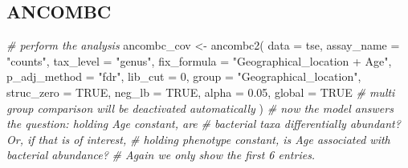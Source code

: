 \documentclass[
]{book}
\newenvironment{Shaded}{\begin{snugshade}}{\end{snugshade}}
\newcommand{\AttributeTok}[1]{\textcolor[rgb]{0.77,0.63,0.00}{#1}}
\newcommand{\CommentTok}[1]{\textcolor[rgb]{0.56,0.35,0.01}{\textit{#1}}}
\newcommand{\ConstantTok}[1]{\textcolor[rgb]{0.00,0.00,0.00}{#1}}
\newcommand{\DecValTok}[1]{\textcolor[rgb]{0.00,0.00,0.81}{#1}}
\newcommand{\FloatTok}[1]{\textcolor[rgb]{0.00,0.00,0.81}{#1}}
\newcommand{\FunctionTok}[1]{\textcolor[rgb]{0.00,0.00,0.00}{#1}}
\newcommand{\NormalTok}[1]{#1}
\newcommand{\OtherTok}[1]{\textcolor[rgb]{0.56,0.35,0.01}{#1}}
\newcommand{\SpecialCharTok}[1]{\textcolor[rgb]{0.00,0.00,0.00}{#1}}
\newcommand{\StringTok}[1]{\textcolor[rgb]{0.31,0.60,0.02}{#1}}
\begin{document}
\hypertarget{ancombc}{%
\subsection{ANCOMBC}\label{ancombc}}

\begin{Shaded}
\begin{Highlighting}[]
\CommentTok{\# perform the analysis }
\NormalTok{ancombc\_cov }\OtherTok{\textless{}{-}} \FunctionTok{ancombc2}\NormalTok{(}
  \AttributeTok{data =}\NormalTok{ tse,}
  \AttributeTok{assay\_name =} \StringTok{"counts"}\NormalTok{,}
  \AttributeTok{tax\_level =} \StringTok{"genus"}\NormalTok{,}
  \AttributeTok{fix\_formula =} \StringTok{"Geographical\_location + Age"}\NormalTok{, }
  \AttributeTok{p\_adj\_method =} \StringTok{"fdr"}\NormalTok{, }
  \AttributeTok{lib\_cut =} \DecValTok{0}\NormalTok{, }
  \AttributeTok{group =} \StringTok{"Geographical\_location"}\NormalTok{, }
  \AttributeTok{struc\_zero =} \ConstantTok{TRUE}\NormalTok{, }
  \AttributeTok{neg\_lb =} \ConstantTok{TRUE}\NormalTok{,}
  \AttributeTok{alpha =} \FloatTok{0.05}\NormalTok{, }
  \AttributeTok{global =} \ConstantTok{TRUE} \CommentTok{\# multi group comparison will be deactivated automatically }
\NormalTok{)}
\CommentTok{\# now the model answers the question: holding Age constant, are }
\CommentTok{\# bacterial taxa differentially abundant? Or, if that is of interest,}
\CommentTok{\# holding phenotype constant, is Age associated with bacterial abundance?}
\CommentTok{\# Again we only show the first 6 entries.}
\end{Highlighting}
\end{Shaded}

\begin{Shaded}
\end{Shaded}
\end{document}
